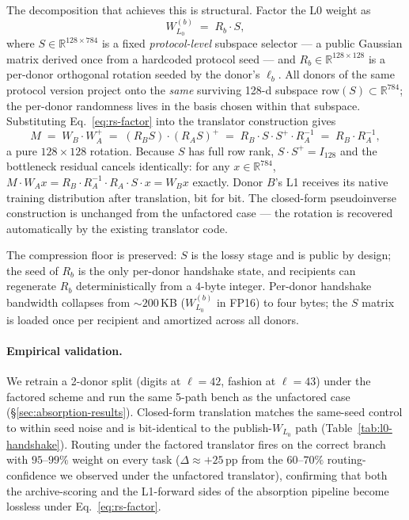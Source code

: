 \documentclass[11pt]{article}
\begin{document}
The decomposition that achieves this is structural. Factor the L0
weight as
\begin{equation}
W_{L_0}^{(b)} \;=\; R_b \cdot S,
\label{eq:rs-factor}
\end{equation}
where $S \in \mathbb{R}^{128 \times 784}$ is a fixed
\emph{protocol-level} subspace selector --- a public Gaussian matrix
derived once from a hardcoded protocol seed --- and $R_b \in
\mathbb{R}^{128 \times 128}$ is a per-donor orthogonal rotation
seeded by the donor's $\ell_b$. All donors of the same protocol
version project onto the \emph{same} surviving 128-d subspace
$\text{row}(S) \subset \mathbb{R}^{784}$; the per-donor randomness
lives in the basis chosen within that subspace. Substituting
Eq.~\ref{eq:rs-factor} into the translator construction gives
\begin{equation}
M \;=\; W_B \cdot W_A^{+}
    \;=\; (R_B S) \cdot (R_A S)^{+}
    \;=\; R_B \cdot S \cdot S^{+} \cdot R_A^{-1}
    \;=\; R_B \cdot R_A^{-1},
\label{eq:rotation-translator}
\end{equation}
a pure $128 \times 128$ rotation. Because $S$ has full row rank,
$S \cdot S^{+} = I_{128}$ and the bottleneck residual cancels
identically: for any $x \in \mathbb{R}^{784}$, $M \cdot W_A x = R_B
\cdot R_A^{-1} \cdot R_A \cdot S \cdot x = W_B x$ exactly. Donor $B$'s
L1 receives its native training distribution after translation, bit
for bit. The closed-form pseudoinverse construction is unchanged from
the unfactored case --- the rotation is recovered automatically by the
existing translator code.

The compression floor is preserved: $S$ is the lossy stage and is
public by design; the seed of $R_b$ is the only per-donor handshake
state, and recipients can regenerate $R_b$ deterministically from a
$4$-byte integer. Per-donor handshake bandwidth collapses from $\sim
200$\,KB ($W_{L_0}^{(b)}$ in FP16) to four bytes; the $S$ matrix is
loaded once per recipient and amortized across all donors.

\paragraph{Empirical validation.}
We retrain a 2-donor split (digits at $\ell = 42$, fashion at
$\ell = 43$) under the factored scheme and run the same 5-path bench
as the unfactored case (\S\ref{sec:absorption-results}). Closed-form
translation matches the same-seed control to within seed noise and is
bit-identical to the publish-$W_{L_0}$ path
(Table~\ref{tab:l0-handshake}). Routing under the factored translator
fires on the correct branch with $95$--$99\%$ weight on every task
($\Delta \approx +25$\,pp from the $60$--$70\%$ routing-confidence we
observed under the unfactored translator), confirming that both the
archive-scoring and the L1-forward sides of the absorption pipeline
become lossless under Eq.~\ref{eq:rs-factor}.
\end{document}
